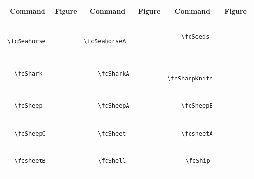 \documentclass[x11names]{article}
\begin{document}
\begin{table}[H]\centering\begin{tabular}{|c|c|c|c|c|c|}\hline{\bf Command} & {\bf Figure} & {\bf Command} & {\bf Figure} & {\bf Command} & {\bf Figure}\\	\hline	&\multirow{5}{*}{	\fcSeahorse	[scale=0.16]} & &\multirow{5}{*}{	\fcSeahorseA	[scale=0.16]} & &\multirow{5}{*}{	\fcSeeds	[scale=0.16]}\\	& & & & & \\	& & & & & \\	\verb|	\fcSeahorse	| & & \verb|	\fcSeahorseA	| & & \verb|	\fcSeeds	| & \\	& & & & & \\	& & & & & \\	& & & & & \\	\hline									
		&\multirow{5}{*}{	\fcShark	[scale=0.16]} & &\multirow{5}{*}{	\fcSharkA	[scale=0.16]} & &\multirow{5}{*}{	\fcSharpKnife	[scale=0.16]}\\	& & & & & \\	& & & & & \\	\verb|	\fcShark	| & & \verb|	\fcSharkA	| & & \verb|	\fcSharpKnife	| & \\	& & & & & \\	& & & & & \\	& & & & & \\	\hline									
		&\multirow{5}{*}{	\fcSheep	[scale=0.64]} & &\multirow{5}{*}{	\fcSheepA	[scale=0.16]} & &\multirow{5}{*}{	\fcSheepB	[scale=0.16]}\\	& & & & & \\	& & & & & \\	\verb|	\fcSheep	| & & \verb|	\fcSheepA	| & & \verb|	\fcSheepB	| & \\	& & & & & \\	& & & & & \\	& & & & & \\	\hline									
		&\multirow{5}{*}{	\fcSheepC	[scale=0.16]} & &\multirow{5}{*}{	\fcSheet	[scale=0.64]} & &\multirow{5}{*}{	\fcsheetA	[scale=0.16]}\\	& & & & & \\	& & & & & \\	\verb|	\fcSheepC	| & & \verb|	\fcSheet	| & & \verb|	\fcsheetA	| & \\	& & & & & \\	& & & & & \\	& & & & & \\	\hline									
		&\multirow{5}{*}{	\fcsheetB	[scale=0.16]} & &\multirow{5}{*}{	\fcShell	[scale=0.16]} & &\multirow{5}{*}{	\fcShip	[scale=0.64]}\\	& & & & & \\	& & & & & \\	\verb|	\fcsheetB	| & & \verb|	\fcShell	| & & \verb|	\fcShip	| & \\	& & & & & \\	& & & & & \\	& & & & & \\	\hline									

\end{tabular}
\end{table}
\end{document}

